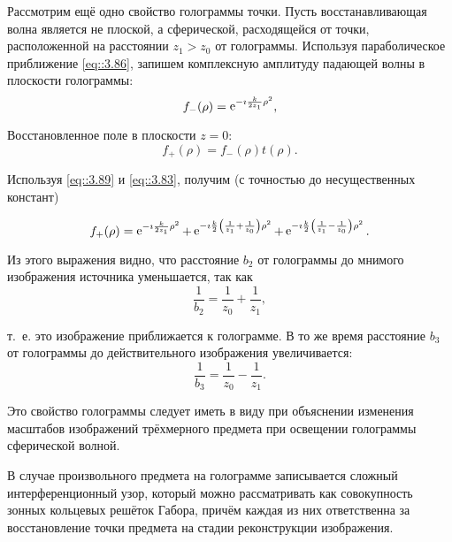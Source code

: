 Рассмотрим ещё одно свойство голограммы точки.
Пусть восстанавливающая волна является не плоской, а сферической,
расходящейся от точки, расположенной на расстоянии $z_1 > z_0$ от голограммы.
Используя параболическое приближение \eqref{eq::3.86}, запишем комплексную амплитуду падающей волны в
плоскости голограммы:
\begin{equation}\label{eq::3.89}
  f_- (\rho) = \mathop{\mathrm e}\nolimits^{ -\imath \frac{k}{2z_1}\rho^2},
\end{equation}

Восстановленное поле в плоскости $z = 0$:
$$
f_+(\rho) = f_-(\rho) t(\rho).
$$

Используя \eqref{eq::3.89} и \eqref{eq::3.83}, получим (с точностью до несущественных констант)

$$
f_+(\rho) = \mathop{\mathrm e}\nolimits^{ -\imath \frac{k}{2z_1}\rho^2} + 
\mathop{\mathrm e}\nolimits^{ -\imath \frac{k}{2}\left( \frac{1}{z_1} + \frac{1}{z_0} \right)\rho^2} + 
\mathop{\mathrm e}\nolimits^{ -\imath \frac{k}{2}\left( \frac{1}{z_1} - \frac{1}{z_0} \right)\rho^2}.
$$

Из этого выражения видно, что расстояние $b_2$ от голограммы до мнимого изображения источника уменьшается, так как
$$
\frac{1}{b_2} = \frac{1}{z_0} + \frac{1}{z_1},
$$

т.~е. это изображение приближается к голограмме.
В то же время расстояние $b_3$ от голограммы до действительного изображения увеличивается:
$$
  \frac{1}{b_3} = \frac{1}{z_0} - \frac{1}{z_1}.
$$

Это свойство голограммы следует иметь в виду при объяснении изменения масштабов изображений трёхмерного предмета при освещении голограммы сферической волной.

В случае произвольного предмета на голограмме записывается сложный интерференционный узор, который можно рассматривать
как совокупность зонных кольцевых решёток Габора, причём каждая
из них ответственна за восстановление  точки предмета на
стадии реконструкции изображения.
